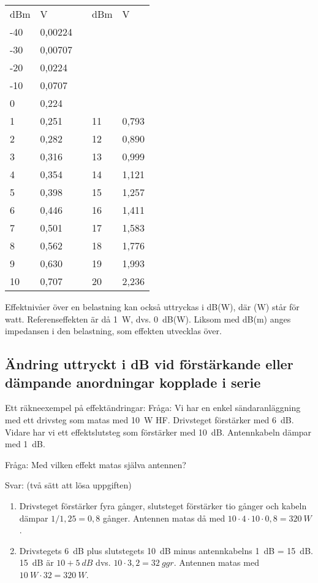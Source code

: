 \begin{center}
\begin{tabular}{l|lp{1cm}l|l}
	dBm & V & & dBm & V \\
	\cline{1-2} \cline{4-5}
	-40 & 0,00224 & & & \\
	-30 & 0,00707 & & & \\
	-20 & 0,0224  & & & \\
	-10 & 0,0707  & & & \\
	0   & 0,224   & & & \\
	1   & 0,251   & & 11 & 0,793 \\
	2   & 0,282   & & 12 & 0,890 \\
	3   & 0,316   & & 13 & 0,999 \\
	4   & 0,354   & & 14 & 1,121 \\
	5   & 0,398   & & 15 & 1,257 \\
	6   & 0,446   & & 16 & 1,411 \\
	7   & 0,501   & & 17 & 1,583 \\
	8   & 0,562   & & 18 & 1,776 \\
	9   & 0,630   & & 19 & 1,993 \\
	10  & 0,707   & & 20 & 2,236
\end{tabular}
\end{center}


\noindent
Effektnivåer över en belastning kan också uttryckas i dB(W), där (W)
står för watt. Referenseffekten är då 1~W, dvs. 0~dB(W).
Liksom med dB(m) anges impedansen i den belastning, som effekten utvecklas över.

\subsection{Ändring uttryckt i dB vid förstärkande eller dämpande anordningar kopplade i serie}

Ett räkneexempel på effektändringar:
Fråga:
Vi har en enkel sändaranläggning med ett drivsteg som matas med 10~W HF.
Drivsteget förstärker med 6~dB. Vidare har vi ett effektslutsteg som förstärker
med 10~dB. Antennkabeln dämpar med 1~dB.

Fråga: Med vilken effekt matas själva antennen?

Svar: (två sätt att lösa uppgiften)
\begin{enumerate}
\item Drivsteget förstärker fyra gånger, slutsteget förstärker tio gånger och
kabeln dämpar \(1/1,25 = 0,8\) gånger. Antennen matas då med
\(10 \cdot 4 \cdot 10 \cdot 0,8 = 320\ W\).
\item Drivstegets 6~dB plus slutstegets 10~dB minus antennkabelns 1~dB = 15~dB.
15~dB är \(10 + 5\ dB\) dvs. \(10 \cdot 3,2 = 32\ ggr\). Antennen matas med
\(10\ W \cdot 32 = 320\ W\).
\end{enumerate}

